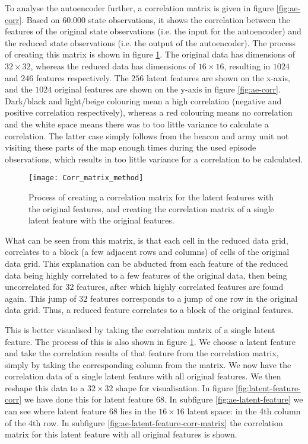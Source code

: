 To analyse the autoencoder further, a correlation matrix is given in figure \ref{fig:ae-corr}. Based on $60.000$ state observations, it shows the correlation between the features of the original state observations (i.e. the input for the autoencoder) and the reduced state observations (i.e. the output of the autoencoder). The process of creating this matrix is shown in figure \ref{fig:ae-corr-process}. The original data has dimensions of $32 \times 32$, whereas the reduced data has dimensions of $16 \times 16$, resulting in $1024$ and $246$ features respectively. The $256$ latent features are shown on the x-axis, and the $1024$ original features are shown on the y-axis in figure \ref{fig:ae-corr}. Dark/black and light/beige colouring mean a high correlation (negative and positive correlation respectively), whereas a red colouring means no correlation and the white space means there was to too little variance to calculate a correlation. The latter case simply follows from the beacon and army unit not visiting these parts of the map enough times during the used episode observations, which results in too little variance for a correlation to be calculated.

\begin{figure}[h]
	\centering
	\texttt{[image: Corr\_matrix\_method]}
	\caption{Process of creating a correlation matrix for the latent features with the original features, and creating the correlation matrix of a single latent feature with the original features.}
	\label{fig:ae-corr-process}
\end{figure}

What can be seen from this matrix, is that each cell in the reduced data grid, correlates to a block (a few adjacent rows and columns) of cells of the original data grid. This explanation can be abducted from each feature of the reduced data being highly correlated to a few features of the original data, then being uncorrelated for $32$ features, after which highly correlated features are found again. This jump of $32$ features corresponds to a jump of one row in the original data grid. Thus, a reduced feature correlates to a block of the original features.

This is better visualised by taking the correlation matrix of a single latent feature. The process of this is also shown in figure \ref{fig:ae-corr-process}. We choose a latent feature and take the correlation results of that feature from the correlation matrix, simply by taking the corresponding column from the matrix. We now have the correlation data of a single latent feature with all original features. We then reshape this data to a $32 \times 32$ shape for visualisation. In figure \ref{fig:latent-feature-corr} we have done this for latent feature $68$. In subfigure \ref{fig:ae-latent-feature} we can see where latent feature $68$ lies in the $16 \times 16$ latent space: in the 4th column of the 4th row. In subfigure \ref{fig:ae-latent-feature-corr-matrix} the correlation matrix for this latent feature with all original features is shown.

